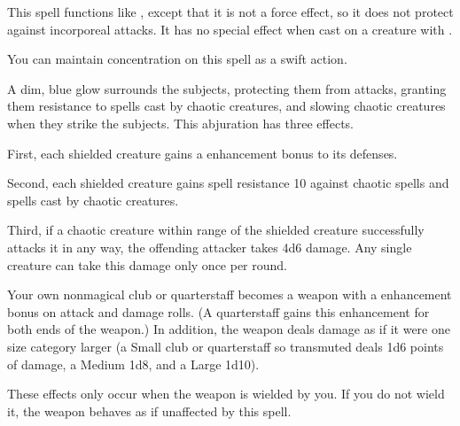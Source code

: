 \begin{spelleffect}
  This spell functions like , except that it is not a force effect, so it does not protect against incorporeal attacks. It has no special effect when cast on a creature with .
\end{spelleffect}
\begin{spelleffect}
  You can maintain concentration on this spell as a swift action.
\end{spelleffect}

\begin{spelleffect}
  A dim, blue glow surrounds the subjects, protecting them from attacks, granting them resistance to spells cast by chaotic creatures, and slowing chaotic creatures when they strike the subjects. This abjuration has three effects.
  \par First, each shielded creature gains a  enhancement bonus to its defenses.
  \par Second, each shielded creature gains spell resistance 10 against chaotic spells and spells cast by chaotic creatures.
  \par Third, if a chaotic creature within \rngmed range of the shielded creature successfully attacks it in any way, the offending attacker takes 4d6 damage. Any single creature can take this damage only once per round.
\end{spelleffect}

\spelldur{\durshort}
\begin{spelleffect}
  Your own nonmagical club or quarterstaff becomes a weapon with a  enhancement bonus on attack and damage rolls. \bonusscalingdescription (A quarterstaff gains this enhancement for both ends of the weapon.) In addition, the weapon deals damage as if it were one size category larger (a Small club or quarterstaff so transmuted deals 1d6 points of damage, a Medium 1d8, and a Large 1d10).
\end{spelleffect}
\begin{spellnotes}
  These effects only occur when the weapon is wielded by you. If you do not wield it, the weapon behaves as if unaffected by this spell.
\end{spellnotes}

